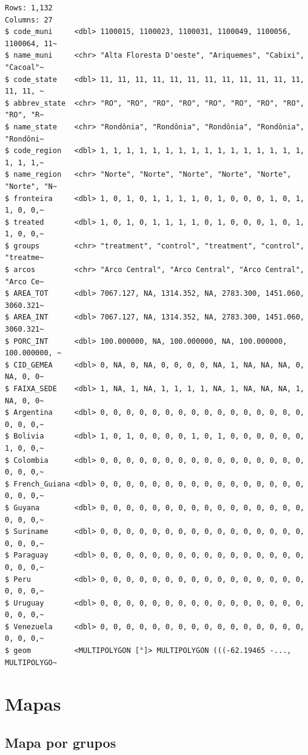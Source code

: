 \documentclass[
  letterpaper,
  DIV=11,
  numbers=noendperiod]{scrartcl}
\begin{document}
\begin{verbatim}
Rows: 1,132
Columns: 27
$ code_muni     <dbl> 1100015, 1100023, 1100031, 1100049, 1100056, 1100064, 11~
$ name_muni     <chr> "Alta Floresta D'oeste", "Ariquemes", "Cabixi", "Cacoal"~
$ code_state    <dbl> 11, 11, 11, 11, 11, 11, 11, 11, 11, 11, 11, 11, 11, 11, ~
$ abbrev_state  <chr> "RO", "RO", "RO", "RO", "RO", "RO", "RO", "RO", "RO", "R~
$ name_state    <chr> "Rondônia", "Rondônia", "Rondônia", "Rondônia", "Rondôni~
$ code_region   <dbl> 1, 1, 1, 1, 1, 1, 1, 1, 1, 1, 1, 1, 1, 1, 1, 1, 1, 1, 1,~
$ name_region   <chr> "Norte", "Norte", "Norte", "Norte", "Norte", "Norte", "N~
$ fronteira     <dbl> 1, 0, 1, 0, 1, 1, 1, 1, 0, 1, 0, 0, 0, 1, 0, 1, 1, 0, 0,~
$ treated       <dbl> 1, 0, 1, 0, 1, 1, 1, 1, 0, 1, 0, 0, 0, 1, 0, 1, 1, 0, 0,~
$ groups        <chr> "treatment", "control", "treatment", "control", "treatme~
$ arcos         <chr> "Arco Central", "Arco Central", "Arco Central", "Arco Ce~
$ AREA_TOT      <dbl> 7067.127, NA, 1314.352, NA, 2783.300, 1451.060, 3060.321~
$ AREA_INT      <dbl> 7067.127, NA, 1314.352, NA, 2783.300, 1451.060, 3060.321~
$ PORC_INT      <dbl> 100.000000, NA, 100.000000, NA, 100.000000, 100.000000, ~
$ CID_GEMEA     <dbl> 0, NA, 0, NA, 0, 0, 0, 0, NA, 1, NA, NA, NA, 0, NA, 0, 0~
$ FAIXA_SEDE    <dbl> 1, NA, 1, NA, 1, 1, 1, 1, NA, 1, NA, NA, NA, 1, NA, 0, 0~
$ Argentina     <dbl> 0, 0, 0, 0, 0, 0, 0, 0, 0, 0, 0, 0, 0, 0, 0, 0, 0, 0, 0,~
$ Bolivia       <dbl> 1, 0, 1, 0, 0, 0, 0, 1, 0, 1, 0, 0, 0, 0, 0, 0, 1, 0, 0,~
$ Colombia      <dbl> 0, 0, 0, 0, 0, 0, 0, 0, 0, 0, 0, 0, 0, 0, 0, 0, 0, 0, 0,~
$ French_Guiana <dbl> 0, 0, 0, 0, 0, 0, 0, 0, 0, 0, 0, 0, 0, 0, 0, 0, 0, 0, 0,~
$ Guyana        <dbl> 0, 0, 0, 0, 0, 0, 0, 0, 0, 0, 0, 0, 0, 0, 0, 0, 0, 0, 0,~
$ Suriname      <dbl> 0, 0, 0, 0, 0, 0, 0, 0, 0, 0, 0, 0, 0, 0, 0, 0, 0, 0, 0,~
$ Paraguay      <dbl> 0, 0, 0, 0, 0, 0, 0, 0, 0, 0, 0, 0, 0, 0, 0, 0, 0, 0, 0,~
$ Peru          <dbl> 0, 0, 0, 0, 0, 0, 0, 0, 0, 0, 0, 0, 0, 0, 0, 0, 0, 0, 0,~
$ Uruguay       <dbl> 0, 0, 0, 0, 0, 0, 0, 0, 0, 0, 0, 0, 0, 0, 0, 0, 0, 0, 0,~
$ Venezuela     <dbl> 0, 0, 0, 0, 0, 0, 0, 0, 0, 0, 0, 0, 0, 0, 0, 0, 0, 0, 0,~
$ geom          <MULTIPOLYGON [°]> MULTIPOLYGON (((-62.19465 -..., MULTIPOLYGO~
\end{verbatim}

\hypertarget{mapas-1}{%
\section{Mapas}\label{mapas-1}}

\hypertarget{mapa-por-grupos}{%
\subsection{Mapa por grupos}\label{mapa-por-grupos}}
\end{document}
